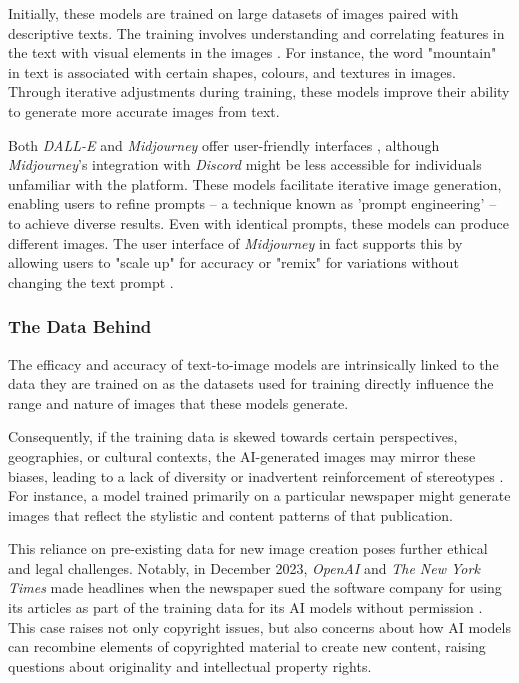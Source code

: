 Initially, these models are trained on large datasets of images paired with descriptive texts. The training involves understanding and correlating features in the text with visual elements in the images \parencite{Bie2023}. For instance, the word "mountain" in text is associated with certain shapes, colours, and textures in images. Through iterative adjustments during training, these models improve their ability to generate more accurate images from text.

Both \textit{DALL-E} and \textit{Midjourney} offer user-friendly interfaces \parencite[5]{Thomas2023}, although \textit{Midjourney}'s integration with \textit{Discord} might be less accessible for individuals unfamiliar with the platform. These models facilitate iterative image generation, enabling users to refine prompts – a technique known as 'prompt engineering' \parencite{Liu2022} – to achieve diverse results. Even with identical prompts, these models can produce different images. The user interface of \textit{Midjourney} in fact supports this by allowing users to "scale up" for accuracy or "remix" for variations without changing the text prompt \parencite[5]{Thomas2023}.

\subsubsection{The Data Behind}
The efficacy and accuracy of text-to-image models are intrinsically linked to the data they are trained on as the datasets used for training directly influence the range and nature of images that these models generate. 

Consequently, if the training data is skewed towards certain perspectives, geographies, or cultural contexts, the AI-generated images may mirror these biases, leading to a lack of diversity or inadvertent reinforcement of stereotypes \parencite{Mehrabi2022}. For instance, a model trained primarily on a particular newspaper might generate images that reflect the stylistic and content patterns of that publication.

This reliance on pre-existing data for new image creation poses further ethical and legal challenges. Notably, in December 2023, \textit{OpenAI} and \textit{The New York Times} made headlines when the newspaper sued the software company for using its articles as part of the training data for its AI models without permission \parencite{Miller2023}. This case raises not only copyright issues, but also concerns about how AI models can recombine elements of copyrighted material to create new content, raising questions about originality and intellectual property rights.

